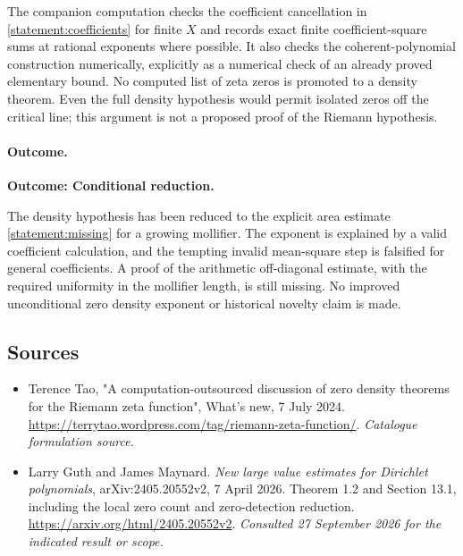 \documentclass[11pt,a4paper]{article}
\numberwithin{equation}{section}
\begin{document}
The companion computation checks the coefficient cancellation in
\eqref{statement:coefficients} for finite $X$ and records exact finite
coefficient-square sums at rational exponents where possible.  It also
checks the coherent-polynomial construction numerically, explicitly as
a numerical check of an already proved elementary bound.  No computed
list of zeta zeros is promoted to a density theorem.  Even the full
density hypothesis would permit isolated zeros off the critical line;
this argument is not a proposed proof of the Riemann hypothesis.

\paragraph{Outcome.}
\textbf{Outcome: Conditional reduction.}

The density hypothesis has been reduced to the explicit area estimate
\eqref{statement:missing} for a growing mollifier.  The exponent is explained
by a valid coefficient calculation, and the tempting invalid
mean-square step is falsified for general coefficients.  A proof of the
arithmetic off-diagonal estimate, with the required uniformity in the
mollifier length, is still missing.  No improved unconditional zero
density exponent or historical novelty claim is made.
\subsection{Sources}
\begin{itemize}\raggedright
\item[\textnormal{[S1]}]\hypertarget{source:statement:1}{} Terence Tao, "A computation-outsourced discussion of zero density theorems for the Riemann zeta function", What's new, 7 July 2024.
\url{https://terrytao.wordpress.com/tag/riemann-zeta-function/}.
{\small\textit{Catalogue formulation source.}}
\item[\textnormal{[E1]}]\hypertarget{extra:statement:1}{} Larry Guth and James Maynard.
\emph{New large value estimates for Dirichlet polynomials}, arXiv:2405.20552v2, 7 April 2026. Theorem 1.2 and Section 13.1, including the local zero count and zero-detection reduction.
\url{https://arxiv.org/html/2405.20552v2}.
{\small\textit{Consulted 27 September 2026 for the indicated result or scope.}}
\end{itemize}
\end{document}
